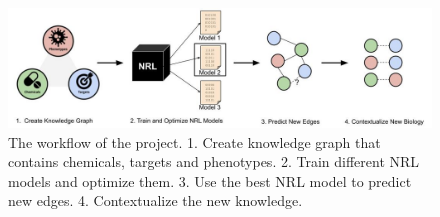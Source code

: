 \begin{figure}[!ht]
    \centering
    \includegraphics[scale=0.39]
    {figures/workflow.jpg}
    \caption [The workflow of the project]{\label{fig:workflow} The workflow of the project. 1. Create knowledge graph that contains chemicals, targets and phenotypes. 2. Train different NRL models and optimize them. 3. Use the best NRL model to predict new edges. 4. Contextualize the new knowledge.}
\end{figure}